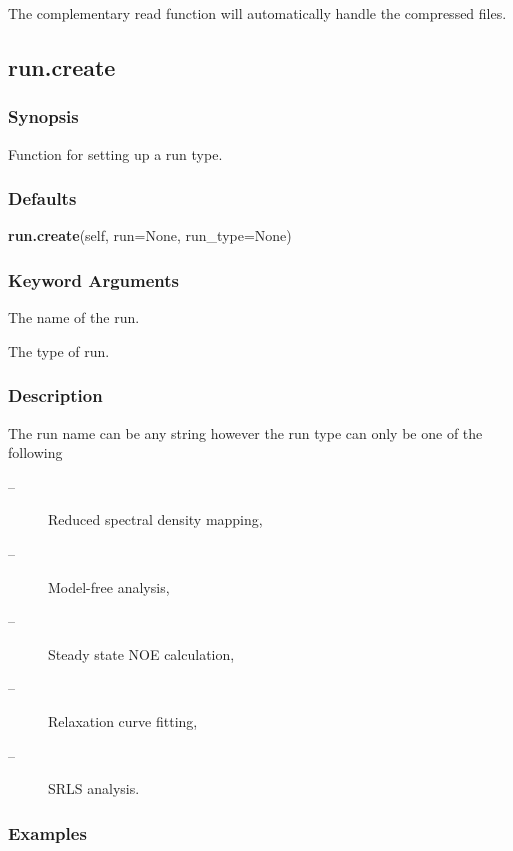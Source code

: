 The complementary read  function will automatically handle the compressed files.


\newpage

\subsection{run.create}


\subsubsection{Synopsis}

Function for setting up a run type.

\subsubsection{Defaults}

\textsf{\textbf{run.create}(self, run=None, run\_type=None)}


\subsubsection{Keyword Arguments}


  The name of the run.

  The type of run.

\subsubsection{Description}

The run name can be any string however the run type can only be one of the following

\begin{description}
\item[    
 --]   Reduced spectral density mapping, 
\item[    
 --]   Model-free analysis,
\item[    
 --]   Steady state NOE calculation,
\item[    
 --]   Relaxation  curve fitting,
\item[    
 --]   SRLS analysis.
\end{description}


\subsubsection{Examples}

